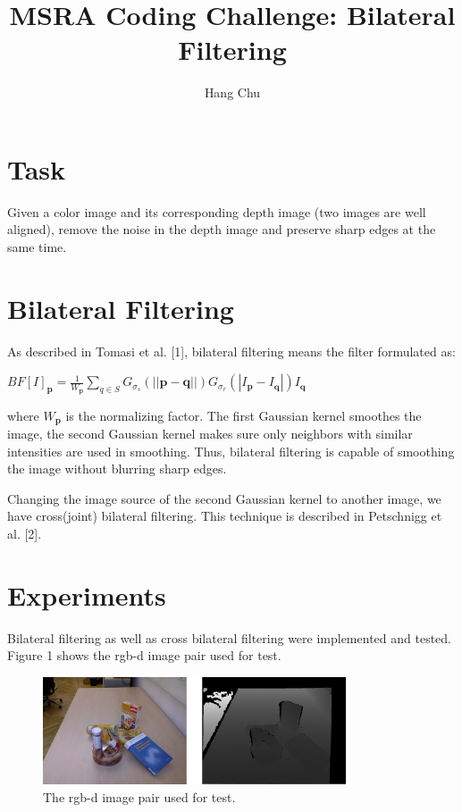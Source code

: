 \documentclass{article}
\author{Hang Chu}
\title{MSRA Coding Challenge: Bilateral Filtering}
\begin{document}
\maketitle
\section{Task}
Given a color image and its corresponding depth image (two images are well aligned), remove the noise in the depth image and preserve sharp edges at the same time.
\section{Bilateral Filtering}
As described in Tomasi et al. [1], bilateral filtering means the filter formulated as:

\begin{center}
$BF[I]_{\boldsymbol{p}}=\frac{1}{W_{\boldsymbol{p}}}\sum\limits_{q\in S}G_{\sigma_s}(||\boldsymbol{p}-\boldsymbol{q}||) G_{\sigma_r}(|I_{\boldsymbol{p}}-I_{\boldsymbol{q}}|)I_{\boldsymbol{q}}$
\end{center}
where $W_{\boldsymbol{p}}$ is the normalizing factor. The first Gaussian kernel smoothes the image, the second Gaussian kernel makes sure only neighbors with similar intensities are used in smoothing. Thus, bilateral filtering is capable of smoothing the image without blurring sharp edges.

Changing the image source of the second Gaussian kernel to another image, we have cross(joint) bilateral filtering. This technique is described in Petschnigg et al. [2].
\section{Experiments}
Bilateral filtering as well as cross bilateral filtering were implemented and tested. Figure 1 shows the rgb-d image pair used for test.
\begin{figure}[ht]
\centering
\includegraphics[width=0.8\textwidth]{test.eps}
\caption{The rgb-d image pair used for test.}
\label{fig1}
\end{figure}
\end{document}
